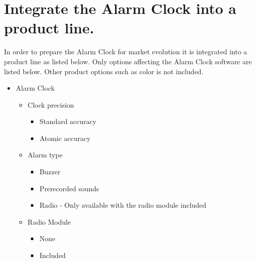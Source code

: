 \documentclass[Main_Assignment3]{subfiles}
\begin{document}
\section{Integrate the Alarm Clock into a product line.}

In order to prepare the Alarm Clock for market evolution it is integrated into a product line as listed below.
Only options affecting the Alarm Clock software are listed below. Other product options such as color is not included.
\begin{itemize}
	\item Alarm Clock
	\begin{itemize}
		\item Clock precision
		\begin{itemize}
			\item Standard accuracy
			\item Atomic accuracy
		\end{itemize}
		\item Alarm type
		\begin{itemize}
			\item Buzzer
			\item Prerecorded sounds
			\item Radio - Only available with the radio module included
		\end{itemize}
		\item Radio Module
		\begin{itemize}
			\item None
			\item Included
		\end{itemize}
	\end{itemize}
\end{itemize}
\end{document}
